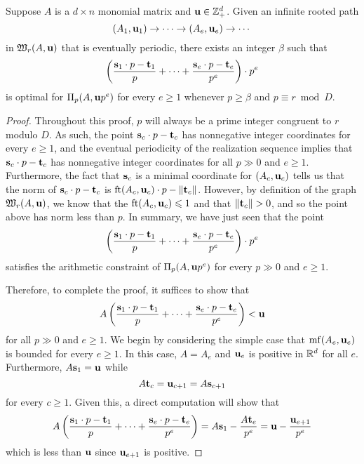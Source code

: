 \documentclass[11pt]{amsart}
\begin{document}
\newpage


\begin{proposition}
Suppose $A$ is a $d \times n$ monomial matrix and $\mathbf{u} \in \mathbb{Z}^d_+$.  Given an infinite rooted path 
\[ (A_1, \mathbf{u}_1) \to \cdots \to (A_e, \mathbf{u}_e) \to \cdots \] in $\mathfrak{W}_r(A, \mathbf{u})$ 
that is eventually periodic, there exists an integer $\beta$ such that 
\[  \left( \frac{ \mathbf{s}_1 \cdot p - \mathbf{t}_1}{p} + \cdots + \frac{ \mathbf{s}_e \cdot p - \mathbf{t}_e}{p^e} \right) \cdot p^e \] 
is optimal for $\Pi_p(A, \mathbf{u}p^e)$ for every $e \geq 1$ whenever $p \geq \beta$ and $p \equiv r \bmod D$.
\end{proposition}

\begin{proof}   Throughout this proof, $p$ will always be a prime integer congruent to $r$ modulo $D$.  As such, the point $\mathbf{s}_c \cdot p - \mathbf{t}_c$  has nonnegative integer coordinates for every $e \geq 1$, and the eventual periodicity of the realization sequence implies that $\mathbf{s}_c \cdot p - \mathbf{t}_c$ has nonnegative integer coordinates for all $p \gg 0$ and $e \geq 1$.   Furthermore, the fact that $\mathbf{s}_c$ is a minimal coordinate for $(A_c, \mathbf{u}_c)$ tells us that the norm of $\mathbf{s}_c \cdot p - \mathbf{t}_c$ is $\operatorname{ft}(A_c, \mathbf{u}_c) \cdot p - \| \mathbf{t}_c \|$.  However, by definition of the graph $\mathfrak{W}_r(A, \mathbf{u})$, we know that the $\operatorname{ft}(A_c, \mathbf{u}_c) \leqslant 1$ and that $\| \mathbf{t}_c \| > 0$, and so the point above has norm less than $p$.  In summary, we have just seen that the point
\[  \left( \frac{ \mathbf{s}_1 \cdot p - \mathbf{t}_1}{p} + \cdots + \frac{ \mathbf{s}_e \cdot p - \mathbf{t}_e}{p^e} \right) \cdot p^e \] satisfies the arithmetic constraint of $\Pi_p(A, \mathbf{u}p^e)$ for every $p \gg 0$ and $e \geq 1$.  

Therefore, to complete the proof, it suffices to show that 
\begin{equation}
\label{goal: e}
A   \left( \frac{ \mathbf{s}_1 \cdot p - \mathbf{t}_1}{p} + \cdots + \frac{ \mathbf{s}_e \cdot p - \mathbf{t}_e}{p^e} \right) < \mathbf{u} 
\end{equation}
for all $p \gg 0$ and $e \geq 1$.  We begin by considering the simple case that $\operatorname{mf}(A_e, \mathbf{u}_e)$ is bounded for every $e \geq 1$.  In this case, $A = A_e$ and $\mathbf{u}_e$ is positive in $\mathbb{R}^d$ for all $e$.  Furthermore, $A \mathbf{s}_1 = \mathbf{u}$ while \[ A \mathbf{t}_c = \mathbf{u}_{c+1} = A \mathbf{s}_{c+1} \] for every $c \geq 1$.   Given this, a direct computation will show that 
\[ A   \left( \frac{ \mathbf{s}_1 \cdot p - \mathbf{t}_1}{p} + \cdots + \frac{ \mathbf{s}_e \cdot p - \mathbf{t}_e}{p^e} \right)  = A \mathbf{s}_1 - \frac{A \mathbf{t}_e}{p^e} = \mathbf{u} - \frac{\mathbf{u}_{e+1}}{p^e} \] which is less than $\mathbf{u}$ since $\mathbf{u}_{e+1}$ is positive.  




\end{proof}
\end{document}
